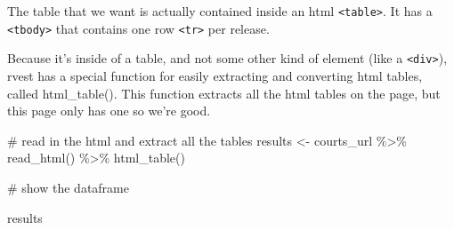 \documentclass[
  letterpaper,
  DIV=11,
  numbers=noendperiod]{scrreprt}
\newenvironment{Shaded}{\begin{snugshade}}{\end{snugshade}}
\newcommand{\CommentTok}[1]{\textcolor[rgb]{0.37,0.37,0.37}{#1}}
\newcommand{\FunctionTok}[1]{\textcolor[rgb]{0.28,0.35,0.67}{#1}}
\newcommand{\NormalTok}[1]{\textcolor[rgb]{0.00,0.23,0.31}{#1}}
\newcommand{\OtherTok}[1]{\textcolor[rgb]{0.00,0.23,0.31}{#1}}
\newcommand{\SpecialCharTok}[1]{\textcolor[rgb]{0.37,0.37,0.37}{#1}}
\begin{document}
The table that we want is actually contained inside an html
\texttt{\textless{}table\textgreater{}}. It has a
\texttt{\textless{}tbody\textgreater{}} that contains one row
\texttt{\textless{}tr\textgreater{}} per release.

Because it's inside of a table, and not some other kind of element (like
a \texttt{\textless{}div\textgreater{}}), rvest has a special function
for easily extracting and converting html tables, called html\_table().
This function extracts all the html tables on the page, but this page
only has one so we're good.

\begin{Shaded}
\begin{Highlighting}[]
\CommentTok{\# read in the html and extract all the tables}
\NormalTok{results }\OtherTok{\textless{}{-}}\NormalTok{ courts\_url }\SpecialCharTok{\%\textgreater{}\%}
  \FunctionTok{read\_html}\NormalTok{() }\SpecialCharTok{\%\textgreater{}\%}
  \FunctionTok{html\_table}\NormalTok{()}

\CommentTok{\# show the dataframe}

\NormalTok{results}
\end{Highlighting}
\end{Shaded}
\end{document}
